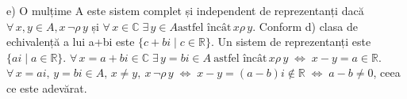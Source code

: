 \documentclass{article}
\DeclareRobustCommand\iff{\;\Longleftrightarrow\;}
\begin{document}
e) O mulțime A este sistem complet și independent de reprezentanți dacă $\forall \, x, y \in A, x \, \neg \rho \, y$ și $\forall \, x \in \mathbb{C} \; \exists \, y \in A \text{astfel încât} \, x \rho \, y$.
\newline
Conform d) clasa de echivalență a lui a+bi este $\{c+bi \mid c \in \mathbb{R}\}$.
Un sistem de reprezentanți este $\{ai \mid a \in \mathbb{R}\}$.
\newline
$\forall \, x = a + bi \in \mathbb{C} \; \exists \, y = bi \in A \ \text{astfel încât} \, x \rho \, y \iff x - y = a \in \mathbb{R} $.
\newline
 $\forall \, x = ai, \, y = bi \in A, \, x \neq y,  \ x \, \neg \rho \, y \iff x - y = (a-b)i \notin \mathbb{R} \iff a - b \neq 0$, ceea ce este adevărat.
\end{document}

